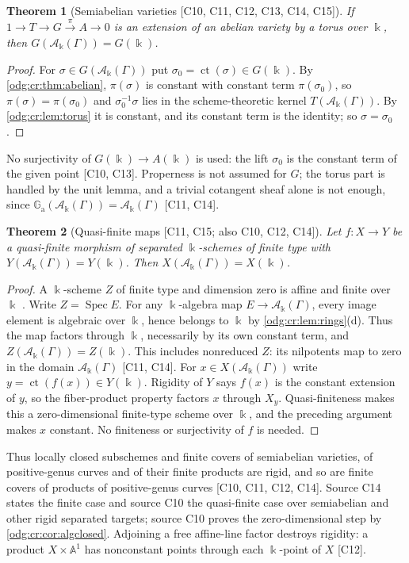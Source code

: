 \documentclass[11pt,oneside]{article}
\numberwithin{equation}{section}
\newtheorem{theorem}{Theorem}[section]
\theoremstyle{definition}
\theoremstyle{remark}
\newcommand{\ct}{\operatorname{ct}}
\newcommand{\src}[1]{\textup{\textsf{\small[#1]}}}
\newcommand{\crA}{\mathcal A_\Bbbk(\Gamma)}
\newcommand{\Aff}{\mathbb A}
\newcommand{\Ga}{\mathbb G_{\mathrm a}}
\newcommand{\Spec}{\operatorname{Spec}}
\begin{document}
\begin{theorem}[Semiabelian varieties \src{C10, C11, C12, C13, C14, C15}]\label{odg:cr:thm:semiabelian}
If $1\to T\to G\xrightarrow{\pi}A\to0$ is an extension of an abelian variety by a
torus over $\Bbbk$, then $G(\crA)=G(\Bbbk)$.
\end{theorem}
\begin{proof}
For $\sigma\in G(\crA)$ put $\sigma_0=\ct(\sigma)\in G(\Bbbk)$. By
\cref{odg:cr:thm:abelian}, $\pi(\sigma)$ is constant with constant term
$\pi(\sigma_0)$, so $\pi(\sigma)=\pi(\sigma_0)$ and $\sigma_0^{-1}\sigma$ lies in the
scheme-theoretic kernel $T(\crA)$. By \cref{odg:cr:lem:torus} it is constant, and its
constant term is the identity; so $\sigma=\sigma_0$.
\end{proof}

No surjectivity of $G(\Bbbk)\to A(\Bbbk)$ is used: the lift $\sigma_0$ is the constant
term of the given point \src{C10, C13}. Properness is not assumed for $G$; the torus
part is handled by the unit lemma, and a trivial cotangent sheaf alone is not
enough, since $\Ga(\crA)=\crA$ \src{C11, C14}.

\begin{theorem}[Quasi-finite maps \src{C11, C15; also C10, C12, C14}]\label{odg:cr:thm:quasifinite}
Let $f:X\to Y$ be a quasi-finite morphism of separated $\Bbbk$-schemes of finite type
with $Y(\crA)=Y(\Bbbk)$. Then $X(\crA)=X(\Bbbk)$.
\end{theorem}
\begin{proof}
A $\Bbbk$-scheme $Z$ of finite type and dimension zero is affine and
finite over $\Bbbk$ \cite[Lemma 33.20.2]{StacksZeroDim}. Write $Z=\Spec E$.
For any $\Bbbk$-algebra map $E\to\crA$, every image element is algebraic
over $\Bbbk$, hence belongs to $\Bbbk$ by \cref{odg:cr:lem:rings}(d).
Thus the map factors through $\Bbbk$, necessarily by its own constant
term, and $Z(\crA)=Z(\Bbbk)$. This includes nonreduced $Z$: its
nilpotents map to zero in the domain $\crA$ \src{C11, C14}.
For $x\in X(\crA)$ write $y=\ct(f(x))\in Y(\Bbbk)$.
Rigidity of $Y$ says $f(x)$ is the constant extension of $y$, so the
fiber-product property factors $x$ through $X_y$. Quasi-finiteness makes
this a zero-dimensional finite-type scheme over $\Bbbk$, and the preceding
argument makes $x$ constant. No finiteness or surjectivity of $f$ is needed.
\end{proof}

Thus locally closed subschemes and finite covers of semiabelian varieties, of
positive-genus curves and of their finite products are rigid, and so are finite
covers of products of positive-genus curves \src{C10, C11, C12, C14}. Source C14
states the finite case and source C10 the quasi-finite case over semiabelian and
other rigid separated targets; source C10 proves the zero-dimensional step by
\cref{odg:cr:cor:algclosed}. Adjoining a free affine-line factor destroys rigidity:
a product $X\times\Aff^1$ has nonconstant points through each $\Bbbk$-point of $X$
\src{C12}.
\end{document}
